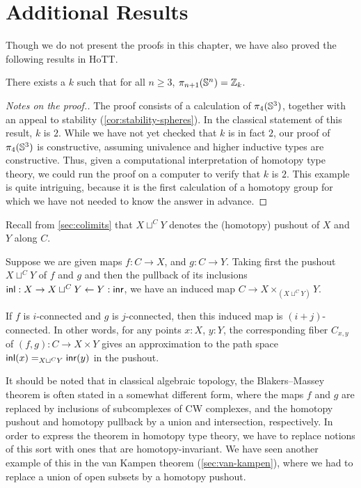 \section{Additional Results}
\label{sec:moreresults}

Though we do not present the proofs in this chapter, we have also proved
the following results in HoTT.  

\begin{thm}
There exists a $k$ such that for all $n \ge 3$, $\pi_{n+1}(\Sn ^n) =
\Z_k$.  
\end{thm}

\begin{proof}[Notes on the proof.]
The proof consists of a calculation of $\pi_4(\Sn ^3)$, together with an
appeal to stability (\cref{cor:stability-spheres}).  In the classical
statement of this result, $k$ is $2$.  While we have not yet checked that
$k$ is in fact $2$, our proof of $\pi_4(\Sn ^3)$ is constructive, assuming
univalence and higher inductive types are constructive.  Thus, given a
computational interpretation of homotopy type theory, we could run the
proof on a computer to verify that $k$ is $2$.  This example is quite
intriguing, because it is the first calculation of a homotopy group
for which we have not needed to know the answer in advance.
\end{proof}

Recall from \autoref{sec:colimits} that $X \sqcup^C Y$ denotes the
(homotopy) pushout of $X$ and $Y$ along $C$.

\begin{thm}\label{Blakers-Massey}
  Suppose we are given maps $f : C  \rightarrow X$, and $g : C \rightarrow Y$. Taking first the pushout $X \sqcup^C Y $ of $f$ and $g$ and then the pullback of its inclusions $\inl : X \rightarrow X \sqcup^C Y \leftarrow Y : \inr$, we have an induced map $C \to X \times_{(X \sqcup^C Y)} Y$.

  If $f$ is $i$-connected and $g$ is $j$-connected, then this induced map is $(i+j)$-connected. In other words, for any points $x:X$, $y:Y$, the corresponding fiber $C_{x,y}$ of $(f,g) : C \to X \times Y $ gives an approximation to the path space $\id[X \sqcup^C Y]{\inl(x)}{\inr(y)}$ in the pushout.
\end{thm}

It should be noted that in classical algebraic topology, the Blakers--Massey theorem is often stated in a somewhat different form, where the maps $f$ and $g$ are replaced by inclusions of subcomplexes of CW complexes, and the homotopy pushout and homotopy pullback by a union and intersection, respectively.
In order to express the theorem in homotopy type theory, we have to replace notions of this sort with ones that are homotopy-invariant.
We have seen another example of this in the van Kampen theorem (\autoref{sec:van-kampen}), where we had to replace a union of open subsets by a homotopy pushout.

